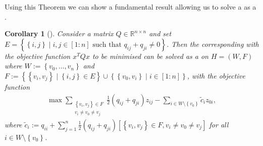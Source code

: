 \documentclass[12pt,a4paper]{article}
\theoremstyle{mythm}
\newtheorem{cor}[thm]{Corollary}
\begin{document}
Using this Theorem we can show a fundamental result allowing us to solve a \BQP as a \MCP. 
\begin{cor}[{\cite[p. 2]{MallachLectureNotes}}]
\label{cor:bqp2mcp} 
Consider a matrix $ Q \in \mathbb{R} ^{ n \times n }  $ and set \\
$ E = \left\{ \left\{ i,j \right\}  \mid i,j \in \left[ 1:n \right] \text{ such that } q _{ ij } + q _{ ji } \neq 0  \right\}  $.
Then the corresponding \BQP with the objective function $ x ^T Q x $ to be minimised can be solved as a \MCP on $ H = \left( W,F \right)  $ where $ W := \left\{ v_0,
\dots, v_n \right\}  $ and $ F := \left\{ \left\{ v_i,v_j \right\}  \mid \left\{ i,j \right\} \in E \right\} \cup \left\{ \left\{ v_0,v_i \right\}  \mid i \in \left[ 1:n
\right]   \right\}  $, with the objective function
\begin{align*}
\max \sum_{  \substack{ \left\{ v_i,v_j \right\} \in F \\ v_i \neq v_0 \neq v_j	 }  }^{  } \frac{ 1 }{ 2 } \left( q _{ ij } + q _{ ji }  \right) z _{ ij } - \sum_{ i \in W
\setminus \left\{  v_0  \right\} }^{  } \widetilde{ c } _{ i } z _{ 0i },
\end{align*} 
where $ \widetilde{ c }_i := q _{ ii } + \sum_{ j=1  }^{ n } \frac{ 1 }{ 2 } \left( q _{ ij } + q _{ ji }  \right) \left[ \left\{ v_i , v_j \right\} \in F, v_i \neq v_0 \neq v_j
\right]  $ for all $ i \in W \setminus \left\{ v_0 \right\}  $.
\end{cor} 
\end{document}
